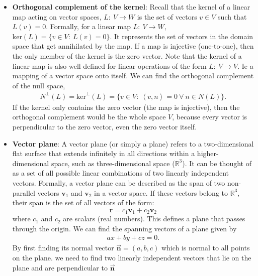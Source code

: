 \documentclass{report}
\begin{document}
\begin{itemize}
        \item \textbf{Orthogonal complement of the kernel}: Recall that the kernel of a linear map acting on vector spaces, $L:\ V \to W$ is the set of vectors $v\in V$ such that $L(v) = 0$. Formally, for a linear map $L:\ V \to W$, $\text{ker}(L) = \{v\in V:\ L(v) = 0\}$. It represents the set of vectors in the domain space that get annihilated by the map. If a map is injective (one-to-one), then the only member of the kernel is the zero vector. Note that the kernel of a linear map is also well defined for linear operations of the form $L:\ V \to V$. Ie a mapping of a vector space onto itself.
            \bigbreak \noindent 
            We can find the orthogonal complement of the null space, 
            \begin{align*}
                N^{\perp}(L) = \text{ker}^{\perp}(L) = \{v\in V:\ \left\langle v, n \right\rangle = 0 \ \forall \ n \in N(L)\}
            .\end{align*}
            If the kernel only contains the zero vector (the map is injective), then the orthogonal complement would be the whole space $V$, because every vector is perpendicular to the zero vector, even the zero vector itself.
        \item \textbf{Vector plane}: A vector plane (or simply a plane) refers to a two-dimensional flat surface that extends infinitely in all directions within a higher-dimensional space, such as three-dimensional space (\(\mathbb{R}^3\)). It can be thought of as a set of all possible linear combinations of two linearly independent vectors.
            Formally, a vector plane can be described as the span of two non-parallel vectors \(\mathbf{v}_1\) and \(\mathbf{v}_2\) in a vector space. If these vectors belong to \(\mathbb{R}^3\), their span is the set of all vectors of the form:
            \[
                \mathbf{r} = c_1 \mathbf{v}_1 + c_2 \mathbf{v}_2
            \]
            where \(c_1\) and \(c_2\) are scalars (real numbers). This defines a plane that passes through the origin.
            \bigbreak \noindent 
            We can find the spanning vectors of a plane given by 
            \begin{align*}
                ax + by + cz = 0
            .\end{align*}
            By first finding its normal vector $\vec{\mathbf{n}} = (a,b,c)$ which is normal to all points on the plane. we need to find two linearly independent vectors that lie on the plane and are perpendicular to $\vec{\mathbf{n}}$
            \bigbreak \noindent 

\end{itemize}
\end{document}
